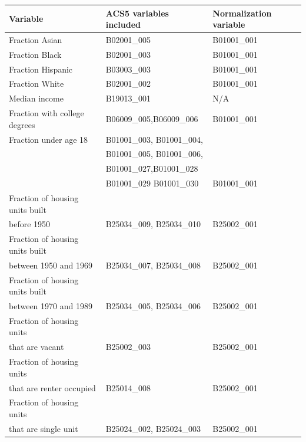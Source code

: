 \documentclass{svjour3}
\begin{document}
\begin{table}
\centering
{}
 \begin{tabular}{||l l l ||} 
 \hline
 Variable & ACS5 variables included & Normalization variable\\ [0.5ex] 
 \hline\hline
 Fraction Asian & B02001_005 & B01001_001 \\ 
 \hline
 Fraction Black & B02001_003 & B01001_001 \\
 \hline
 Fraction Hispanic & B03003_003 & B01001_001  \\
 \hline
 Fraction White &  B02001_002 & B01001_001 \\
 \hline
 Median income & B19013_001 & N/A \\
 \hline
 Fraction with college degrees & B06009_005,B06009_006& B01001_001 \\
 \hline
 Fraction under age 18 & B01001_003, B01001_004, &\\ & B01001_005, B01001_006, &\\& B01001_027,B01001_028&\\& B01001_029 B01001_030 & B01001_001 \\
 \hline
Fraction of housing units built &&\\ before 1950 & B25034_009, B25034_010 & B25002_001 \\
\hline
Fraction of housing units built &&\\ between 1950 and 1969 & B25034_007, B25034_008 & B25002_001 \\ 
\hline
Fraction of housing units built &&\\ between 1970 and 1989 & B25034_005, B25034_006 & B25002_001\\ 
\hline
Fraction of housing units &&\\ that are vacant & B25002_003 & B25002_001\\ 
\hline
Fraction of housing units &&\\ that are renter occupied & B25014_008 & B25002_001\\ 
\hline
Fraction of housing units &&\\ that are single unit & B25024_002, B25024_003 & B25002_001 \\ [1ex] 
\hline

\end{tabular}

\end{table}
\clearpage
\end{document}
